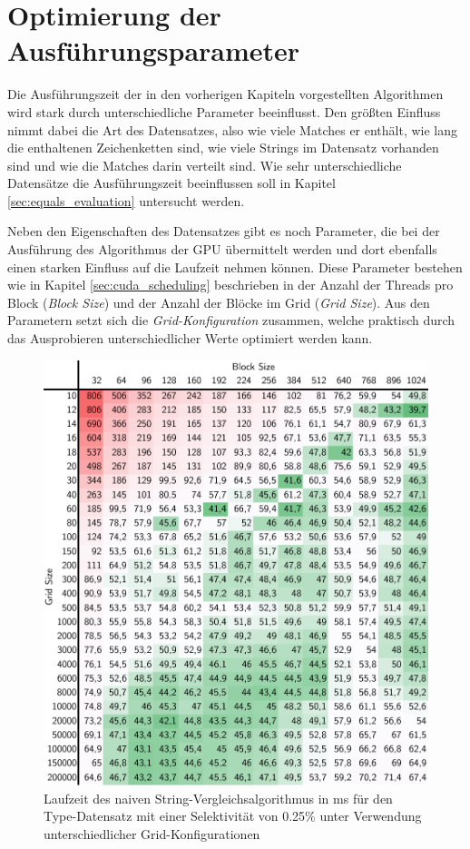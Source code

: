 \chapter{Optimierung der Ausführungsparameter}

Die Ausführungszeit der in den vorherigen Kapiteln vorgestellten Algorithmen wird stark durch unterschiedliche Parameter beeinflusst.
Den größten Einfluss nimmt dabei die Art des Datensatzes, also wie viele Matches er enthält, wie lang die enthaltenen Zeichenketten sind, wie viele Strings im Datensatz vorhanden sind und wie die Matches darin verteilt sind.
Wie sehr unterschiedliche Datensätze die Ausführungszeit beeinflussen soll in Kapitel \ref{sec:equals_evaluation} untersucht werden.

Neben den Eigenschaften des Datensatzes gibt es noch Parameter, die bei der Ausführung des Algorithmus der GPU übermittelt werden und dort ebenfalls einen starken Einfluss auf die Laufzeit nehmen können.
Diese Parameter bestehen wie in Kapitel \ref{sec:cuda_scheduling} beschrieben in der Anzahl der Threads pro Block (\emph{Block Size}) und der Anzahl der Blöcke im Grid (\emph{Grid Size}).
Aus den Parametern setzt sich die \emph{Grid-Konfiguration} zusammen, welche praktisch durch das Ausprobieren unterschiedlicher Werte optimiert werden kann.

\begin{figure}[ht]
	\includegraphics[]{bilder/parameter025.pdf}
	\caption{Laufzeit des naiven String-Vergleichsalgorithmus in ms für den Type-Datensatz mit einer Selektivität von 0.25\% unter Verwendung unterschiedlicher Grid-Konfigurationen}
	\label{parameter025}
\end{figure}

